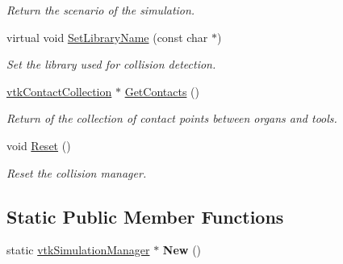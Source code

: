 \begin{DoxyCompactItemize}
\begin{DoxyCompactList}\small\item\em Return the scenario of the simulation. \item\end{DoxyCompactList}\item 
virtual void \hyperlink{classvtkSimulationManager_acea563e70de3bad3bb963c570be7ed3f}{SetLibraryName} (const char $\ast$)
\begin{DoxyCompactList}\small\item\em Set the library used for collision detection. \item\end{DoxyCompactList}\item 
\hypertarget{classvtkSimulationManager_a8bf0753310b43531e451897dd31b41b6}{
\hyperlink{classvtkContactCollection}{vtkContactCollection} $\ast$ \hyperlink{classvtkSimulationManager_a8bf0753310b43531e451897dd31b41b6}{GetContacts} ()}
\label{classvtkSimulationManager_a8bf0753310b43531e451897dd31b41b6}

\begin{DoxyCompactList}\small\item\em Return of the collection of contact points between organs and tools. \item\end{DoxyCompactList}\item 
\hypertarget{classvtkSimulationManager_a5e78deed9ac4a4ccc39eca336b54187e}{
void \hyperlink{classvtkSimulationManager_a5e78deed9ac4a4ccc39eca336b54187e}{Reset} ()}
\label{classvtkSimulationManager_a5e78deed9ac4a4ccc39eca336b54187e}

\begin{DoxyCompactList}\small\item\em Reset the collision manager. \item\end{DoxyCompactList}\end{DoxyCompactItemize}
\subsection*{Static Public Member Functions}
\begin{DoxyCompactItemize}
\item 
\hypertarget{classvtkSimulationManager_afa973a81999bbe10cc7a6fd6bea50493}{
static \hyperlink{classvtkSimulationManager}{vtkSimulationManager} $\ast$ {\bfseries New} ()}
\label{classvtkSimulationManager_afa973a81999bbe10cc7a6fd6bea50493}

\end{DoxyCompactItemize}
